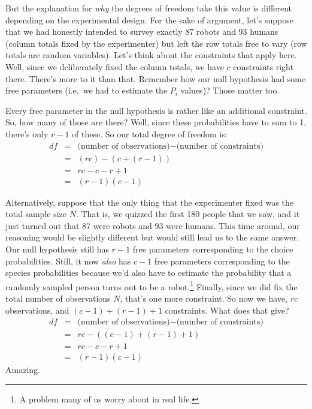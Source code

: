 \documentclass[
  11pt,
  a4paper,
  twoside,symmetric,openright]{book}
\theoremstyle{break}
\theoremstyle{break}
\begin{document}
But the explanation for \emph{why} the degrees of freedom take this value is different depending on the experimental design. For the sake of argument, let's suppose that we had honestly intended to survey exactly 87 robots and 93 humans (column totals fixed by the experimenter) but left the row totals free to vary (row totals are random variables). Let's think about the constraints that apply here. Well, since we deliberately fixed the column totals, we have \(c\) constraints right there. There's more to it than that. Remember how our null hypothesis had some free parameters (i.e.~we had to estimate the \(P_i\) values)? Those matter too.

Every free parameter in the null hypothesis is rather like an additional constraint. So, how many of those are there? Well, since these probabilities have to sum to 1, there's only \(r-1\) of these. So our total degree of freedom is:
\[
\begin{array}{rcl}
df &=& \mbox{(number of observations)} - \mbox{(number of constraints)} \\
&=& (rc) - (c + (r-1)) \\
&=& rc - c - r + 1 \\
&=& (r - 1)(c - 1)
\end{array}
\]

Alternatively, suppose that the only thing that the experimenter fixed was the total sample size \(N\). That is, we quizzed the first 180 people that we saw, and it just turned out that 87 were robots and 93 were humans. This time around, our reasoning would be slightly different but would still lead us to the same answer. Our null hypothesis still has \(r-1\) free parameters corresponding to the choice probabilities. Still, it now \emph{also} has \(c-1\) free parameters corresponding to the species probabilities because we'd also have to estimate the probability that a randomly sampled person turns out to be a robot.\footnote{A problem many of us worry about in real life.} Finally, since we did fix the total number of observations \(N\), that's one more constraint. So now we have, \(rc\) observations, and \((c-1) + (r-1) + 1\) constraints. What does that give?
\[
\begin{array}{rcl}
df &=& \mbox{(number of observations)} - \mbox{(number of constraints)} \\
&=& rc - ( (c-1) + (r-1) + 1) \\
&=& rc - c - r + 1 \\
&=& (r - 1)(c - 1)
\end{array}
\]
Amazing.
\end{document}
